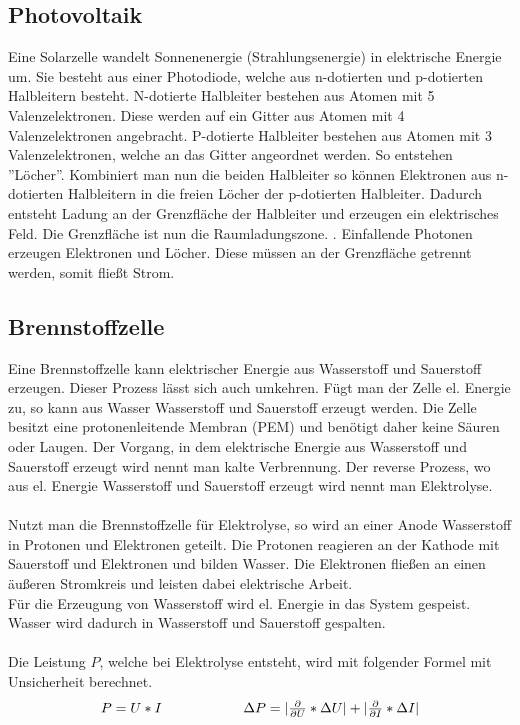 \documentclass[12pt,a4paper,twoside]{article}
\begin{document}
\subsection{Photovoltaik}
Eine Solarzelle wandelt Sonnenenergie (Strahlungsenergie) in elektrische Energie um. Sie besteht aus einer Photodiode, welche aus n-dotierten und p-dotierten Halbleitern besteht. 
N-dotierte Halbleiter bestehen aus Atomen mit 5 Valenzelektronen. Diese werden auf ein Gitter aus Atomen mit 4 Valenzelektronen angebracht. 
P-dotierte Halbleiter bestehen aus Atomen mit 3 Valenzelektronen, welche an das Gitter angeordnet werden. So entstehen ''Löcher''. Kombiniert man nun die beiden Halbleiter so können Elektronen aus n-dotierten Halbleitern in die freien Löcher der p-dotierten Halbleiter. 
Dadurch entsteht Ladung an der Grenzfläche der Halbleiter und erzeugen ein elektrisches Feld. Die Grenzfläche ist nun die Raumladungszone. . 
Einfallende Photonen erzeugen Elektronen und Löcher. Diese müssen an der Grenzfläche getrennt werden, somit fließt Strom. 

\subsection{Brennstoffzelle}
Eine Brennstoffzelle kann elektrischer Energie aus Wasserstoff und Sauerstoff erzeugen. 
Dieser Prozess lässt sich auch umkehren. Fügt man der Zelle el. Energie zu, so kann aus Wasser Wasserstoff und Sauerstoff erzeugt werden. 
Die Zelle besitzt eine protonenleitende Membran (PEM) und benötigt daher keine Säuren oder Laugen. 
Der Vorgang, in dem elektrische Energie aus Wasserstoff und Sauerstoff erzeugt wird nennt man kalte Verbrennung. Der reverse Prozess, wo aus el. Energie Wasserstoff und Sauerstoff erzeugt wird nennt man Elektrolyse. 
\\
\\ 
Nutzt man die Brennstoffzelle für Elektrolyse, so wird an einer Anode Wasserstoff in Protonen und Elektronen geteilt. Die Protonen reagieren an der Kathode mit Sauerstoff und Elektronen und bilden Wasser. Die Elektronen fließen an einen äußeren Stromkreis und leisten dabei elektrische Arbeit. 
\\
Für die Erzeugung von Wasserstoff wird el. Energie in das System gespeist. Wasser wird dadurch in Wasserstoff und Sauerstoff gespalten. 
\\
\\
Die Leistung $P$, welche bei Elektrolyse entsteht, wird mit folgender Formel mit Unsicherheit berechnet. 
\begin{equation}
    \label{eq:leistung}
    \centerline{$P = U*I$  \\ $\Delta P = \vert \frac{\partial }{\partial U} * \Delta U \vert + \vert \frac{\partial }{\partial I} * \Delta I \vert$}
\end{equation}
\end{document}
